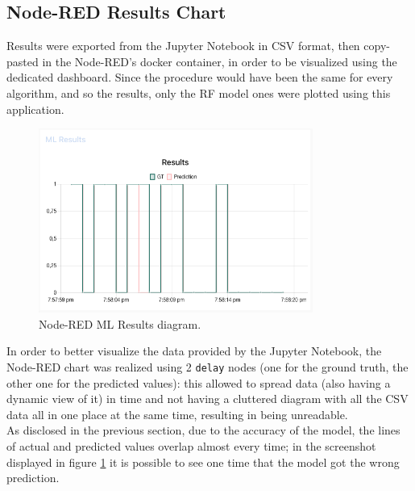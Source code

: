 \documentclass{article}
\begin{document}
\subsection[]{Node-RED Results Chart}

Results were exported from the Jupyter Notebook in CSV format, then copy-pasted in the Node-RED's docker container, in order to be visualized using the dedicated dashboard. Since the procedure would have been the same for every algorithm, and so the results, only the RF model ones were plotted using this application.

\begin{figure}[h!]
	\centering
	\includegraphics[width=9cm]{assets/node-red-chart.png}
	\caption{Node-RED ML Results diagram.}
	\label{fig::node-red-chart}
\end{figure}
In order to better visualize the data provided by the Jupyter Notebook, the Node-RED chart was realized using 2 \texttt{delay} nodes (one for the ground truth, the other one for the predicted values): this allowed to spread data (also having a dynamic view of it) in time and not having a cluttered diagram with all the CSV data all in one place at the same time, resulting in being unreadable. \\ As disclosed in the previous section, due to the accuracy of the model, the lines of actual and predicted values overlap almost every time; in the screenshot displayed in figure \ref{fig::node-red-chart} it is possible to see one time that the model got the wrong prediction.
 
\end{document}
